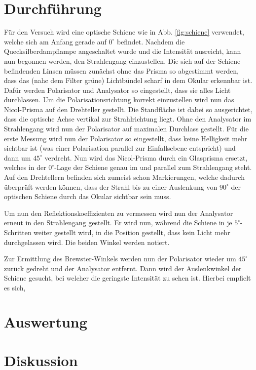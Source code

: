 \documentclass[12pt,a4paper,titlepage,headinclude,bibtotoc]{scrartcl}
\begin{document}
\section{Durchführung}
\label{sec:durchfuehrung}
Für den Versuch wird eine optische Schiene wie in Abb. \ref{fig:schiene} verwendet, welche sich am Anfang gerade auf $0^\circ $  befindet.
Nachdem die Quecksilberdampflampe angeschaltet wurde und die Intensität ausreicht, kann nun begonnen werden, den Strahlengang einzustellen.
Die sich auf der Schiene befindenden Linsen müssen zunächst ohne das Prisma so abgestimmt werden, dass das (nahc dem Filter grüne) Lichtbündel scharf in dem Okular erkennbar ist.
Dafür werden Polarisator und Analysator so eingestellt, dass sie alles Licht durchlassen.
Um die Polarisationsrichtung korrekt einzustellen wird nun das Nicol-Prisma auf den Drehteller gestellt.
Die Standfläche ist dabei so ausgerichtet, dass die optische Achse vertikal zur Strahlrichtung liegt.
Ohne den Analysator im Strahlengang wird nun der Polarisator auf maximalen Durchlass gestellt.
Für die erste Messung wird nun der Polarisator so eingestellt, dass keine Helligkeit mehr sichtbar ist (was einer Polarisation parallel zur Einfallsebene entspricht) und dann um $45^\circ$ verdreht.
Nun wird das Nicol-Prisma durch ein Glasprisma ersetzt, welches in der $0^\circ$-Lage der Schiene genau im und parallel zum Strahlengang steht.
Auf den Drehtellern befinden sich zumeist schon Markierungen, welche  dadurch überprüft werden können, dass der Strahl bis zu einer Auslenkung von $90^\circ$ der optischen Schiene durch das Okular sichtbar sein muss.

Um nun den Reflektionskoeffizienten zu vermessen wird nun der Analysator erneut in den Strahlengang gestellt.
Er wird nun, während die Schiene in je $5^\circ$-Schritten weiter gestellt wird, in die Position gestellt, dass kein Licht mehr durchgelassen wird.
Die beiden Winkel werden notiert.

Zur Ermittlung des Brewster-Winkels werden nun der Polarisator wieder um $45^\circ$ zurück gedreht und der Analysator entfernt.
Dann wird der Auslenkwinkel der Schiene gesucht, bei welcher die geringste Intensität zu sehen ist.
Hierbei empfielt es sich,


\section{Auswertung}
\label{sec:auswertung}


\section{Diskussion}
\label{sec:diskussion}


 
 
\end{document}
